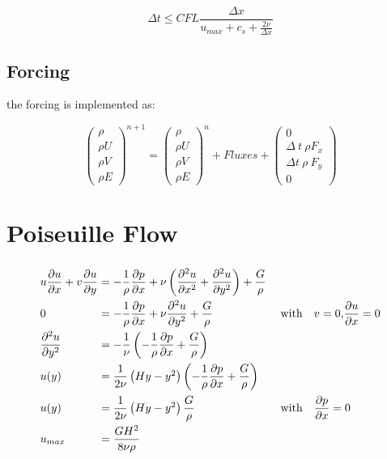 \documentclass[
	pdftex,             %
	12pt,				%
	a4paper,		   	%
	english,				%
	oneside,			%
]{article}
\begin{document}
\begin{equation}
\Delta t \leq CFL \dfrac{\Delta x}{u_{max} + c_s + \frac{2 \nu}{\Delta x}}
\end{equation}

\subsection{Forcing}

the forcing is implemented as:

\begin{equation}
\begin{pmatrix}
\rho \\ \rho U \\ \rho V \\ \rho E
\end{pmatrix}^{n+1}
=
\begin{pmatrix}
\rho \\ \rho U \\ \rho V \\ \rho E
\end{pmatrix}^n
+ Fluxes +
\begin{pmatrix}
0 \\ \Delta~t~\rho F_x \\ \Delta t~\rho~F_y \\ 0
\end{pmatrix} 
\end{equation}

\clearpage

\section{Poiseuille Flow}

\begin{eqnarray}
\begin{split}
\arraycolsep=1.4pt\def\arraystretch{2.2}
\begin{array}{lcll}
u\dfrac{\partial u}{\partial x} + v\dfrac{\partial u}{\partial y}
&=& 
-\dfrac{1}{\rho} \dfrac{\partial p}{\partial x}
+ \nu \left( \dfrac{\partial^2 u}{\partial x^2} + \dfrac{\partial^2 u}{\partial y^2} \right)
+ \dfrac{G}{\rho}&
\\
0 &=& -\dfrac{1}{\rho} \dfrac{\partial p}{\partial x} + \nu \dfrac{\partial^2 u}{\partial y^2} + \dfrac{G}{\rho}
&\textnormal{~~~with~~~} v = 0 \textnormal{,} \dfrac{\partial u}{\partial x} = 0
\\
\dfrac{\partial^2 u}{\partial y^2} 
&=&
-\dfrac{1}{\nu} \left( -\dfrac{1}{\rho} \dfrac{\partial p}{\partial x} + \dfrac{G}{\rho}\right)&
\\
u(y) &=& \dfrac{1}{2\nu} \left( Hy - y^2 \right) 
         \left( -\dfrac{1}{\rho} \dfrac{\partial p}{\partial x} + \dfrac{G}{\rho} \right)&
\\
u(y) &=& \dfrac{1}{2\nu} \left( Hy - y^2 \right) \dfrac{G}{\rho}
&\textnormal{~~~with~~~}
\dfrac{\partial p}{\partial x} = 0
\\
u_{max} &=& \dfrac{GH^2}{8\nu\rho}&
\end{array}
\end{split}
\end{eqnarray}
\end{document}
